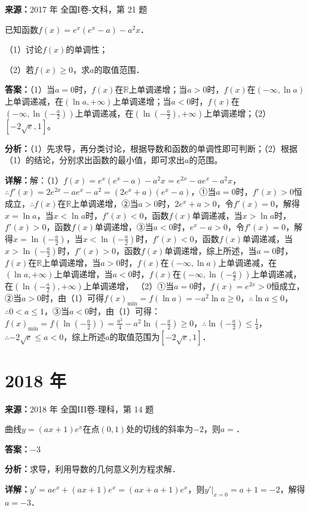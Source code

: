 \begin{question}[points=12]
\textbf{来源：}2017 年 全国I卷-文科，第 21 题\par
已知函数$f(x)=e^x(e^x-a)-a^2x$．

（1）讨论$f(x)$的单调性；

（2）若$f(x)\ge0$，求$a$的取值范围．
\begin{solution}
\textbf{答案：}（1）当$a=0$时，$f(x)$在$\mathbb{R}$上单调递增；当$a>0$时，$f(x)$在$(-\infty,\ln a)$上单调递减，在$(\ln a,+\infty)$上单调递增；当$a<0$时，$f(x)$在$(-\infty,\ln(-\frac{a}{2}))$上单调递减，在$(\ln(-\frac{a}{2}),+\infty)$上单调递增；（2）$[-2\sqrt{e},1]$。

\textbf{分析：}（1）先求导，再分类讨论，根据导数和函数的单调性即可判断；（2）根据（1）的结论，分别求出函数的最小值，即可求出$a$的范围。

\textbf{详解：}解：（1）$f(x)=e^x(e^x-a)-a^2x=e^{2x}-ae^x-a^2x$，$\therefore f'(x)=2e^{2x}-ae^x-a^2=(2e^x+a)(e^x-a)$，①当$a=0$时，$f'(x)>0$恒成立，$\therefore f(x)$在$\mathbb{R}$上单调递增，②当$a>0$时，$2e^x+a>0$，令$f'(x)=0$，解得$x=\ln a$，当$x<\ln a$时，$f'(x)<0$，函数$f(x)$单调递减，当$x>\ln a$时，$f'(x)>0$，函数$f(x)$单调递增，③当$a<0$时，$e^x-a>0$，令$f'(x)=0$，解得$x=\ln(-\frac{a}{2})$，当$x<\ln(-\frac{a}{2})$时，$f'(x)<0$，函数$f(x)$单调递减，当$x>\ln(-\frac{a}{2})$时，$f'(x)>0$，函数$f(x)$单调递增，综上所述，当$a=0$时，$f(x)$在$\mathbb{R}$上单调递增，当$a>0$时，$f(x)$在$(-\infty,\ln a)$上单调递减，在$(\ln a,+\infty)$上单调递增，当$a<0$时，$f(x)$在$(-\infty,\ln(-\frac{a}{2}))$上单调递减，在$(\ln(-\frac{a}{2}),+\infty)$上单调递增，
（2）①当$a=0$时，$f(x)=e^{2x}>0$恒成立，②当$a>0$时，由（1）可得$f(x)_{\min}=f(\ln a)=-a^2\ln a\ge0$，$\therefore\ln a\le0$，$\therefore0<a\le1$，③当$a<0$时，由（1）可得：$f(x)_{\min}=f(\ln(-\frac{a}{2}))=\frac{a^2}{4}-a^2\ln(-\frac{a}{2})\ge0$，$\therefore\ln(-\frac{a}{2})\le\frac{1}{4}$，$\therefore -2\sqrt{e}\le a<0$，综上所述$a$的取值范围为$[-2\sqrt{e},1]$．
\end{solution}
\end{question}

\section*{2018 年}

\begin{question}[points=5]
\textbf{来源：}2018 年 全国III卷-理科，第 14 题\par
曲线$y=(ax+1)e^x$在点$(0,1)$处的切线的斜率为$-2$，则$a=$．
\fillin[{$-3$}]
\begin{solution}
\textbf{答案：}$-3$

\textbf{分析：}求导，利用导数的几何意义列方程求解．

\textbf{详解：}$y'=ae^x+(ax+1)e^x=(ax+a+1)e^x$，则$y'|_{x=0}=a+1=-2$，解得$a=-3$．
\end{solution}
\end{question}

